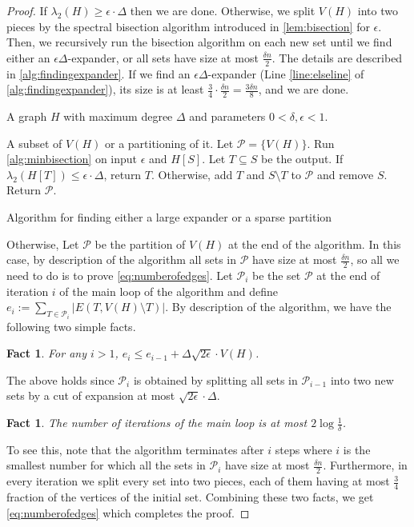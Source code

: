 \documentclass[11pt]{article}
\newcommand{\Input}{\item[{\bf Input:}]}
\newcommand{\Output}{\item[{\bf Output:}]}
\newtheorem{fact}[theorem]{Fact}
\begin{document}
\begin{proof}
If  $\lambda_2(H) 
\geq \epsilon\cdot  \Delta$ then we are done. Otherwise, we split 
$V(H)$ into two pieces by the spectral bisection algorithm introduced in \autoref{lem:bisection} for $\epsilon$. Then, we recursively run the bisection algorithm  
on each new set until we find either an $\epsilon \Delta$-expander, or all sets have size at most $\frac{\delta n}{2}$. The details are described in  \autoref{alg:findingexpander}. If we find an $\epsilon\Delta$-expander (Line \ref{line:elseline} of  \autoref{alg:findingexpander}),  its size is at least $ \frac{3}{4}\cdot 
 \frac{\delta n}{2}=\frac{3\delta n}{8}$, and we are done. 

\begin{algorithm}
\begin{algorithmic}[1]
	\Input A graph $H$ with maximum degree $\Delta$ and parameters $0 < \delta,\epsilon < 1$.
	\Output A subset of $V(H)$ or a partitioning of it. 
	\State Let $\mathcal{P}=\{V(H)\}$. 
	        \State Run \autoref{alg:minbisection} on input $\epsilon$ and $H[S]$. Let $T \subseteq S$ be the output.
	        \State If $\lambda_2(H[T]) \leq \epsilon\cdot \Delta$, return $T$.
	        Otherwise, add $T$ and $S\setminus{T}$ to $\mathcal{P}$ and remove $S$. \label{line:elseline}
		    \EndFor
	\EndWhile	
		\State Return $\mathcal{P}$.\label{line:nonexpanding}
\end{algorithmic}
\caption{Algorithm for finding either a large expander or a sparse partition}
\label{alg:findingexpander}
\end{algorithm}
Otherwise, Let $\mathcal{P}$ be the partition of $V(H)$ at the end of the algorithm. 
In this case, by description of the  algorithm all sets in $\mathcal{P}$ have size at most $\frac{\delta n}{ 2}$, so all we need to do is to prove \eqref{eq:numberofedges}.
Let $\mathcal{P}_i$ be the set $\mathcal{P}$ at the end of iteration $i$ of the main 
loop of the algorithm and define $e_i := \sum_{T \in \mathcal{P}_i} |E(T,V(H)\setminus{T})|$.    
By  description of the algorithm, we have the following two simple facts.
\begin{fact}
For any $i>1$, $e_{i} \leq e_{i-1}+\Delta \sqrt{2\epsilon}\cdot V(H)$. 
\end{fact}
The above holds since $\mathcal{P}_i$ is obtained by splitting all sets in $\mathcal{P}_{i-1}$ into two new sets by a cut of expansion at most $\sqrt{2\epsilon}\cdot  \Delta$.
\begin{fact}
The number of iterations of the main loop is at most $2\log\frac{1}{\delta}$.
\end{fact}
To see this, note that the algorithm terminates after $i$ steps where $i$ is the smallest number for which all the sets in $\mathcal{P}_i$ have size at most $\frac{\delta n}{2}$. Furthermore, in every iteration we split every set into two pieces, each of them having at most $\frac{3}{4}$ fraction of the vertices of the initial set. 
Combining these two facts, we get \eqref{eq:numberofedges} which completes the proof. 
\end{proof}
\end{document}
